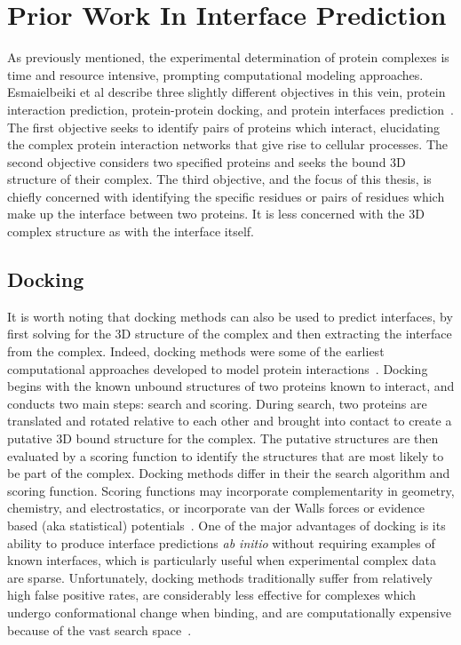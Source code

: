 
\chapter{Prior Work In Interface Prediction}
\label{chap:relatedwork} 


As previously mentioned, the experimental determination of protein complexes is time and resource intensive, prompting computational modeling approaches.
Esmaielbeiki et al describe three slightly different objectives in this vein, protein interaction prediction, protein-protein docking, and protein interfaces prediction~\cite{esmaielbeiki2015}.
The first objective seeks to identify pairs of proteins which interact, elucidating the complex protein interaction networks that give rise to cellular processes. 
The second objective considers two specified proteins and seeks the bound 3D structure of their complex.
The third objective, and the focus of this thesis, is chiefly concerned with identifying the specific residues or pairs of residues which make up the interface between two proteins.
It is less concerned with the 3D complex structure as with the interface itself.

\section{Docking}

It is worth noting that docking methods can also be used to predict interfaces, by first solving for the 3D structure of the complex and then extracting the interface from the complex.
Indeed, docking methods were some of the earliest computational approaches developed to model protein interactions~\cite{janin1995}.
Docking begins with the known unbound structures of two proteins known to interact, and conducts two main steps: search and scoring.
During search, two proteins are translated and rotated relative to each other and brought into contact to create a putative 3D bound structure for the complex.
The putative structures are then evaluated by a scoring function to identify the structures that are most likely to be part of the complex.
Docking methods differ in their the search algorithm and scoring function.
Scoring functions may incorporate complementarity in geometry, chemistry, and electrostatics, or incorporate van der Walls forces or evidence based (aka statistical) potentials~\cite{tuncbag2011}\cite{janin1995}.
One of the major advantages of docking is its ability to produce interface predictions \textit{ab initio} without requiring examples of known interfaces, which is particularly useful when experimental complex data are sparse.
Unfortunately, docking methods traditionally suffer from relatively high false positive rates, are considerably less effective for complexes which undergo conformational change when binding, and are computationally expensive because of the vast search space~\cite{janin1995}\cite{tuncbag2011}.

